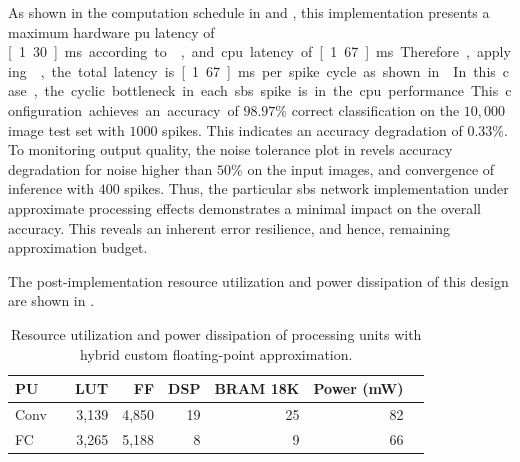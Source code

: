 As shown in the computation schedule in  and , this implementation presents a maximum hardware \gls{pu} latency of \unit[1.30]{ms} according to , and \gls{cpu} latency of \unit[1.67]{ms}. Therefore, applying , the total latency is \unit[1.67]{ms} per spike cycle as shown in . In this case, the cyclic bottleneck in each \gls{sbs} spike is in the \gls{cpu} performance.

This configuration achieves an accuracy of $98.97\%$ correct classification on the $10,000$ image test set with $1000$ spikes. This indicates an accuracy degradation of $0.33\%$. To monitoring output quality, the noise tolerance plot in  revels accuracy degradation for noise higher than $50\%$ on the input images, and convergence of inference with $400$ spikes. Thus, the particular \gls{sbs} network implementation under approximate processing effects demonstrates a minimal impact on the overall accuracy. This reveals an inherent error resilience, and hence, remaining approximation budget.

The post-implementation resource utilization and power dissipation of this design are shown in .

\begin{table}[h!]\centering
	\caption{Resource utilization and power dissipation of processing units with hybrid custom floating-point approximation.}\label{tab:resource_cfp}
	\scriptsize
	\begin{tabular}{lrrrrrrr}\toprule
		\textbf{PU} & &\textbf{LUT} &\textbf{FF} &\textbf{DSP} &\textbf{BRAM 18K} &\textbf{Power (mW)} \\\midrule
		Conv & &3,139 &4,850 &19 &25 &82 \\
		FC & &3,265 &5,188 &8 &9 &66 \\
		\bottomrule
	\end{tabular}
\end{table}



